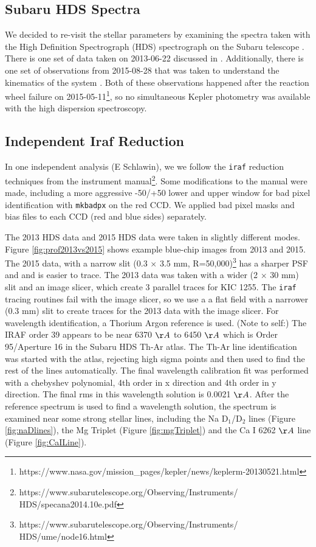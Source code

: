 \documentclass[twocolumn]{aastex61}
\newcommand{\shStar}{KIC 1255}
\begin{document}
\subsection{Subaru HDS Spectra}

We decided to re-visit the stellar parameters by examining the spectra taken with the High Definition Spectrograph (HDS) spectrograph on the Subaru telescope \citep{noguchi2002hds}.
There is one set of data taken on 2013-06-22 discussed in \citet{kawahara2013starspots}.
Additionally, there is one set of observations from 2015-08-28 that was taken to understand the kinematics of the system \citep{masuda2018rvKIC1255}.
Both of these observations happened after the reaction wheel failure on 2015-05-11\footnote{https://www.nasa.gov/mission\_pages/kepler/news/keplerm-20130521.html}, so no simultaneous Kepler photometry was available with the high dispersion spectroscopy.

\subsection{Independent Iraf Reduction}

In one independent analysis (E Schlawin), we we follow the \texttt{iraf} reduction techniques from the instrument manual\footnote{https://www.subarutelescope.org/Observing/Instruments/\\HDS/specana2014.10e.pdf}.
Some modifications to the manual were made, including a more aggressive -50/+50 lower and upper window for bad pixel identification with \texttt{mkbadpx} on the red CCD.
We applied bad pixel masks and bias files to each CCD (red and blue sides) separately.

The 2013 HDS data and 2015 HDS data were taken in slightly different modes.
Figure \ref{fig:prof2013vs2015} shows example blue-chip images from 2013 and 2015.
The 2015 data, with a narrow slit (0.3 $\times$ 3.5 mm, R=50,000)\footnote{https://www.subarutelescope.org/Observing/Instruments/\\HDS/ume/node16.html} has a sharper PSF and and is easier to trace.
The 2013 data was taken with a wider (2 $\times$ 30 mm) slit and an image slicer, which create 3 parallel traces for \shStar.
The \texttt{iraf} tracing routines fail with the image slicer, so we use a a flat field with a narrower (0.3 mm) slit to create traces for the 2013 data with the image slicer.
For wavelength identification, a Thorium Argon reference is used.
(Note to self:) The IRAF order 39 appears to be near 6370 $\AA$ to 6450 $\AA$ which is Order 95/Aperture 16 in the Subaru HDS Th-Ar atlas.
The Th-Ar line identification was started with the atlas, rejecting high sigma points and then used to find the rest of the lines automatically.
The final wavelength calibration fit was performed with a chebyshev polynomial, 4th order in x direction and 4th order in y direction.
The final rms in this wavelength solution is 0.0021 $\AA$.
After the reference spectrum is used to find a wavelength solution, the spectrum is examined near some strong stellar lines, including the Na D$_1$/D$_2$ lines (Figure \ref{fig:naDlines}), the Mg Triplet (Figure \ref{fig:mgTriplet}) and the Ca I 6262 $\AA$ line (Figure \ref{fig:CaILine}).
\end{document}
